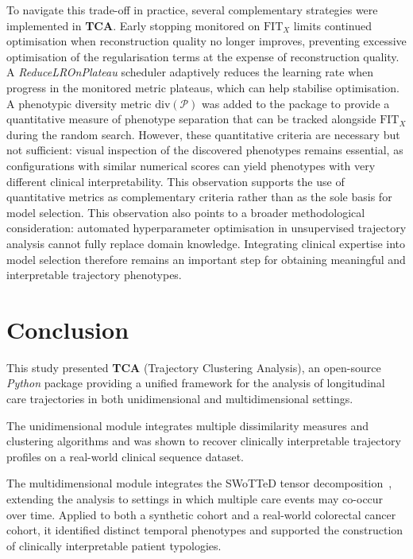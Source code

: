\documentclass[pdflatex,sn-mathphys-num,referee,lineno]{sn-jnl}
\newcommand{\proglang}[1]{\textit{#1}}
\newcommand{\pkg}[1]{\textbf{#1}}
\begin{document}
To navigate this trade-off in practice, several complementary strategies were implemented in \pkg{TCA}.
Early stopping monitored on $\text{FIT}_X$ limits continued optimisation when reconstruction quality no longer improves, preventing excessive optimisation of the regularisation terms at the expense of reconstruction quality.
A \emph{ReduceLROnPlateau} scheduler adaptively reduces the learning rate when progress in the monitored metric plateaus, which can help stabilise optimisation.
A phenotypic diversity metric $\text{div}(\mathcal{P})$ was added to the package to provide a quantitative measure of phenotype separation that can be tracked alongside $\text{FIT}_X$ during the random search.
However, these quantitative criteria are necessary but not sufficient: visual inspection of the discovered phenotypes remains essential, as configurations with similar numerical scores can yield phenotypes with very different clinical interpretability.
This observation supports the use of quantitative metrics as complementary criteria rather than as the sole basis for model selection.
This observation also points to a broader methodological consideration: automated hyperparameter optimisation in unsupervised trajectory analysis cannot fully replace domain knowledge. 
Integrating clinical expertise into model selection therefore remains an important step for obtaining meaningful and interpretable trajectory phenotypes.

\section{Conclusion}\label{sec:conclusion}

This study presented \pkg{TCA} (Trajectory Clustering Analysis), an open-source \proglang{Python} package providing a unified framework for the analysis of longitudinal care trajectories in both unidimensional and multidimensional settings.

The unidimensional module integrates multiple dissimilarity measures and clustering algorithms and was shown to recover clinically interpretable trajectory profiles on a real-world clinical sequence dataset.

The multidimensional module integrates the SWoTTeD tensor decomposition~\cite{sebia2024swotted}, extending the analysis to settings in which multiple care events may co-occur over time. 
Applied to both a synthetic cohort and a real-world colorectal cancer cohort, it identified distinct temporal phenotypes and supported the construction of clinically interpretable patient typologies.
\end{document}
